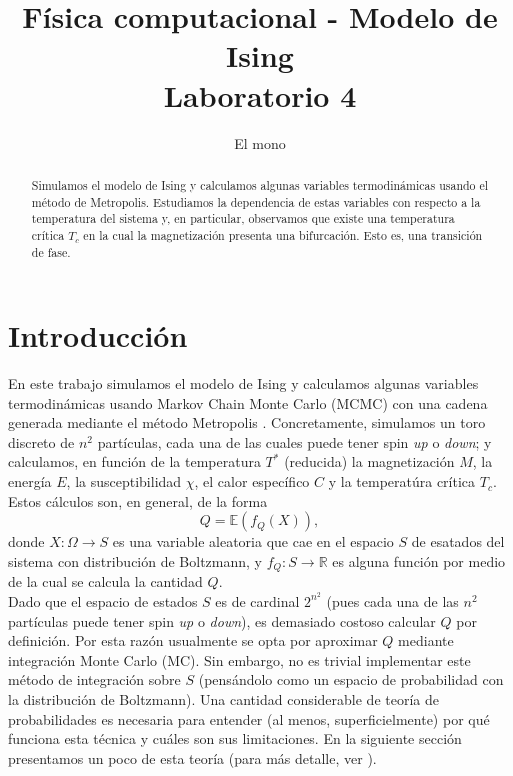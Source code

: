 \documentclass[a4paper,12pt]{article}
\title{Física computacional - Modelo de Ising \\ Laboratorio 4}
\author{El mono}
\date{}
\newcommand{\R}{\mathbb{R}}
\newcommand{\E}{\mathbb{E}}
\begin{document}
\maketitle

\begin{abstract}
    Simulamos el modelo de Ising y calculamos algunas variables termodinámicas usando el método de Metropolis. Estudiamos la dependencia de estas variables con respecto a la temperatura del sistema y, en particular, observamos que existe una temperatura crítica $T_c$ en la cual la magnetización presenta una bifurcación. Esto es, una transición de fase.
\end{abstract}

\section{Introducción}

En este trabajo simulamos el modelo de Ising y calculamos algunas variables termodinámicas usando Markov Chain Monte Carlo (MCMC) con una cadena generada mediante el método Metropolis \cite{metropolis1953equation}. Concretamente, simulamos un toro discreto de $n^2$ partículas, cada una de las cuales puede tener spin {\it up} o {\it down}; y calculamos, en función de la temperatura $T^*$ (reducida) la magnetización $M$, la energía $E$, la susceptibilidad $\chi$, el calor específico $C$ y la temperatúra crítica $T_c$. Estos cálculos son, en general, de la forma
\begin{equation}
    \label{eq:ejemplo}
    Q = \E(f_Q(X)),
\end{equation}
donde $X : \Omega \to S$ es una variable aleatoria que cae en el espacio $S$ de esatados del sistema con distribución de Boltzmann, y $f_Q : S \to \R$ es alguna función por medio de la cual se calcula la cantidad $Q$.\\

Dado que el espacio de estados $S$  es de cardinal $2^{n^2}$ (pues cada una de las $n^2$ partículas puede tener spin {\it up} o {\it down}), es demasiado costoso calcular $Q$ por definición. Por esta razón usualmente se opta por aproximar $Q$ mediante integración Monte Carlo (MC). Sin embargo, no es trivial implementar este método de integración sobre $S$ (pensándolo como un espacio de probabilidad con la distribución de Boltzmann). Una cantidad considerable de teoría de probabilidades es necesaria para entender (al menos, superficielmente) por qué funciona esta técnica y cuáles son sus limitaciones. En la siguiente sección presentamos un poco de esta teoría (para más detalle, ver \cite{janke2009statistical,schachinger2007mcmc}).
\end{document}
